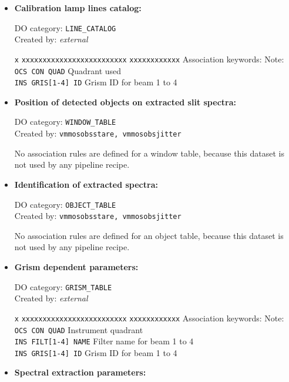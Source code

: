 \begin{itemize}
\item {\bf Calibration lamp lines catalog:}

DO category: {\tt LINE\_CATALOG} \\
Created by: {\it external}

\begin{tabbing}
{\tt x} \= {\tt xxxxxxxxxxxxxxxxxxxxxxxxx} \= {\tt xxxxxxxxxxxx} \kill
\> Association keywords: \> Note: \\
\> {\tt OCS CON QUAD} \> Quadrant used \\
\> {\tt INS GRIS[1-4] ID} \> Grism ID for beam 1 to 4 \\
\end{tabbing}

\item {\bf Position of detected objects on extracted slit spectra:}

DO category: {\tt WINDOW\_TABLE} \\
Created by: {\tt vmmosobsstare, vmmosobsjitter}

No association rules are defined for a window table, because
this dataset is not used by any pipeline recipe.

\item {\bf Identification of extracted spectra:}

DO category: {\tt OBJECT\_TABLE} \\
Created by: {\tt vmmosobsstare, vmmosobsjitter}

No association rules are defined for an object table, because
this dataset is not used by any pipeline recipe.

\item {\bf Grism dependent parameters:}

DO category: {\tt GRISM\_TABLE} \\
Created by: {\it external}

\begin{tabbing}
{\tt x} \= {\tt xxxxxxxxxxxxxxxxxxxxxxxxx} \= {\tt xxxxxxxxxxxx} \kill
\> Association keywords: \> Note: \\
\> {\tt OCS CON QUAD} \> Instrument quadrant \\
\> {\tt INS FILT[1-4] NAME} \> Filter name for beam 1 to 4 \\
\> {\tt INS GRIS[1-4] ID} \> Grism ID for beam 1 to 4 \\
\end{tabbing}

\item {\bf Spectral extraction parameters:}


\end{itemize}
